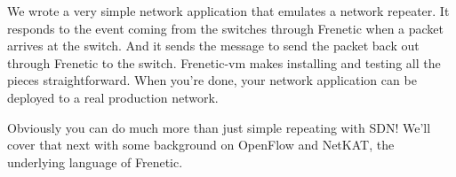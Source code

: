 We wrote a very simple network application that emulates a network repeater.   
It responds to the  event coming from the switches through Frenetic when a packet 
arrives at the switch.  
And it sends the  message to send the packet back out through Frenetic to the switch.  
Frenetic-vm makes installing and testing all the pieces straightforward. 
When you're done, your network application can be deployed to a real production network.

Obviously you can do much more than just simple repeating with SDN!  
We'll cover that next with some background on OpenFlow and NetKAT, the underlying language of Frenetic. 